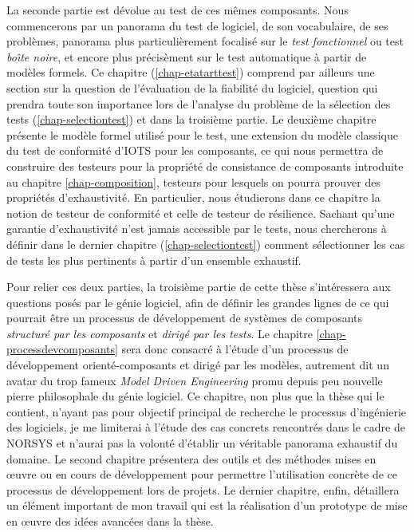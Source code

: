 La seconde partie est d\'evolue au test de ces m\^emes
composants. Nous commencerons par un panorama du test de logiciel, de
son vocabulaire, de ses probl\`emes, panorama plus
particuli\`erement focalis\'e sur le \emph{test fonctionnel} ou test
\emph{bo\^{\i}te noire}, et encore plus pr\'ecis\`ement sur le test
automatique \`a partir de mod\`eles formels. Ce chapitre (\ref{chap-etatarttest}) comprend
par ailleurs une section sur la question de l'\'evaluation de la
fiabilit\'e du logiciel, question qui prendra toute son importance
lors de l'analyse du probl\`eme de la s\'election des tests
(\ref{chap-selectiontest}) et dans la troisi\`eme partie. Le
deuxi\`eme chapitre pr\'esente le mod\`ele formel utilis\'e pour
le test, une extension du mod\`ele classique du test de conformit\'e
d'\textsf{IOTS} pour les composants, ce qui nous permettra de
construire des testeurs pour la propri\'et\'e de consistance de
composants introduite au chapitre \ref{chap-composition}, testeurs
pour lesquels on pourra prouver des propri\'et\'es
d'exhaustivit\'e. En particulier, nous \'etudierons dans ce chapitre
la notion de testeur de conformit\'e et celle de testeur de
r\'esilience. Sachant qu'une garantie d'exhaustivit\'e n'est jamais
accessible par le tests, nous chercherons \`a d\'efinir dans le
dernier chapitre (\ref{chap-selectiontest}) comment s\'electionner
les cas de tests les plus pertinents \`a partir d'un ensemble
exhaustif. 

Pour relier ces deux parties, la troisi\`eme partie de cette th\`ese
s'int\'eressera aux questions pos\'es par le g\'enie logiciel, afin
de d\'efinir les grandes lignes de ce qui pourrait \^etre un
processus de d\'eveloppement de syst\`emes de composants
\emph{structur\'e par les composants} et \emph{dirig\'e par les
  tests}. Le chapitre \ref{chap-processdevcomposants} sera donc
consacr\'e \`a l'\'etude d'un processus de d\'eveloppement
orient\'e-composants et  dirig\'e par les mod\`eles, autrement dit
un avatar du trop fameux \emph{Model Driven Engineering} promu depuis peu
nouvelle pierre philosophale du g\'enie logiciel. Ce chapitre, non
plus que la th\`ese qui le contient, n'ayant pas pour objectif
principal de recherche le processus d'ing\'enierie des logiciels,
je me limiterai \`a l'\'etude des cas concrets rencontr\'es dans le
cadre de NORSYS et n'aurai pas la volont\'e d'\'etablir un
v\'eritable panorama exhaustif du domaine. Le second chapitre
pr\'esentera des outils et des m\'ethodes mises en \oe uvre ou en
cours de d\'eveloppement pour permettre l'utilisation concr\`ete de
ce processus de d\'eveloppement lors de projets. Le dernier
chapitre, enfin, d\'etaillera un \'el\'ement important de mon
travail qui est la r\'ealisation d'un prototype de mise en \oe uvre
des id\'ees avanc\'ees dans la th\`ese. 

